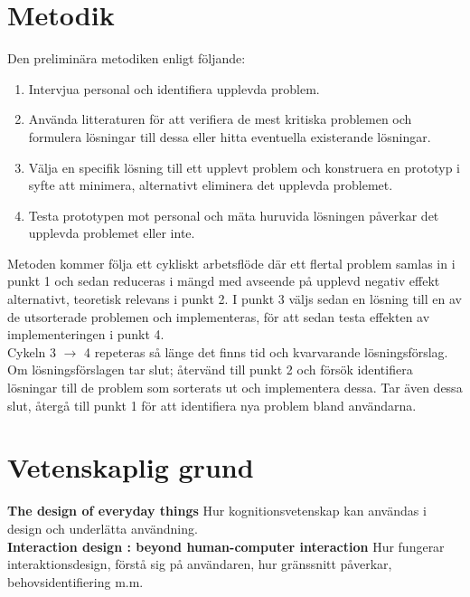\documentclass{article}
\begin{document}
\section*{Metodik}

  Den preliminära metodiken enligt följande:
  \begin{enumerate}
    \item{Intervjua personal och identifiera upplevda problem.}
    \item{Använda litteraturen för att verifiera de mest kritiska problemen och
        formulera lösningar till dessa eller hitta eventuella existerande
        lösningar.}
    \item{Välja en specifik lösning till ett upplevt problem och konstruera en
        prototyp i syfte att minimera, alternativt eliminera det upplevda
        problemet.}
    \item{Testa prototypen mot personal och mäta huruvida lösningen påverkar
        det upplevda problemet eller inte.}
  \end{enumerate}

  Metoden kommer följa ett cykliskt arbetsflöde där ett flertal problem samlas
  in i punkt 1 och sedan reduceras i mängd med avseende på upplevd negativ
  effekt alternativt, teoretisk relevans i punkt 2. I punkt 3 väljs sedan en
  lösning till en av de utsorterade problemen och implementeras, för att sedan
  testa effekten av implementeringen i punkt 4. \\

  Cykeln 3 $\rightarrow$ 4 repeteras så länge det finns tid och kvarvarande
  lösningsförslag. Om lösningsförslagen tar slut; återvänd till punkt 2 och
  försök identifiera lösningar till de problem som sorterats ut och
  implementera dessa. Tar även dessa slut, återgå till punkt 1 för att
  identifiera nya problem bland användarna.

\section*{Vetenskaplig grund}

  \textbf{The design of everyday things}%
  Hur kognitionsvetenskap kan användas i design och underlätta användning. \\

  \textbf{Interaction design : beyond human-computer
    interaction}%
  Hur fungerar interaktionsdesign, förstå sig på användaren, hur gränssnitt
  påverkar, behovsidentifiering m.m.
\end{document}
